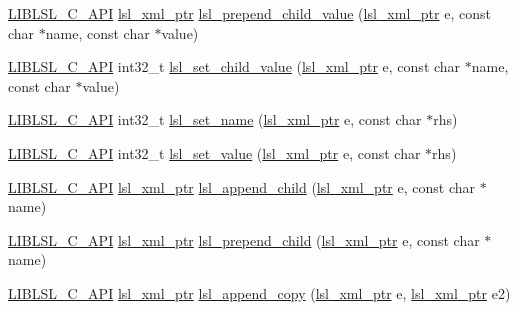 \begin{DoxyCompactItemize}
\item 
\hyperlink{lsl__cpp_8h_aafd0ef1813e8be84a1420c4f1df64615}{L\+I\+B\+L\+S\+L\+\_\+\+C\+\_\+\+A\+PI} \hyperlink{namespacelsl_a5edc7a49a1a1be1634fe6dce3d59c59b}{lsl\+\_\+xml\+\_\+ptr} \hyperlink{namespacelsl_a40369db591e0a19927d76b6d5c811a94}{lsl\+\_\+prepend\+\_\+child\+\_\+value} (\hyperlink{namespacelsl_a5edc7a49a1a1be1634fe6dce3d59c59b}{lsl\+\_\+xml\+\_\+ptr} e, const char $\ast$name, const char $\ast$value)
\item 
\hyperlink{lsl__cpp_8h_aafd0ef1813e8be84a1420c4f1df64615}{L\+I\+B\+L\+S\+L\+\_\+\+C\+\_\+\+A\+PI} int32\+\_\+t \hyperlink{namespacelsl_a637223b4077e6cfa0392d02f9f274ba7}{lsl\+\_\+set\+\_\+child\+\_\+value} (\hyperlink{namespacelsl_a5edc7a49a1a1be1634fe6dce3d59c59b}{lsl\+\_\+xml\+\_\+ptr} e, const char $\ast$name, const char $\ast$value)
\item 
\hyperlink{lsl__cpp_8h_aafd0ef1813e8be84a1420c4f1df64615}{L\+I\+B\+L\+S\+L\+\_\+\+C\+\_\+\+A\+PI} int32\+\_\+t \hyperlink{namespacelsl_af13c49d3abab79ae9dd6d94ca7cdc877}{lsl\+\_\+set\+\_\+name} (\hyperlink{namespacelsl_a5edc7a49a1a1be1634fe6dce3d59c59b}{lsl\+\_\+xml\+\_\+ptr} e, const char $\ast$rhs)
\item 
\hyperlink{lsl__cpp_8h_aafd0ef1813e8be84a1420c4f1df64615}{L\+I\+B\+L\+S\+L\+\_\+\+C\+\_\+\+A\+PI} int32\+\_\+t \hyperlink{namespacelsl_ab072800f46e425c22568529419a3301b}{lsl\+\_\+set\+\_\+value} (\hyperlink{namespacelsl_a5edc7a49a1a1be1634fe6dce3d59c59b}{lsl\+\_\+xml\+\_\+ptr} e, const char $\ast$rhs)
\item 
\hyperlink{lsl__cpp_8h_aafd0ef1813e8be84a1420c4f1df64615}{L\+I\+B\+L\+S\+L\+\_\+\+C\+\_\+\+A\+PI} \hyperlink{namespacelsl_a5edc7a49a1a1be1634fe6dce3d59c59b}{lsl\+\_\+xml\+\_\+ptr} \hyperlink{namespacelsl_a4e7b789b1a631d207683ba6fd821571f}{lsl\+\_\+append\+\_\+child} (\hyperlink{namespacelsl_a5edc7a49a1a1be1634fe6dce3d59c59b}{lsl\+\_\+xml\+\_\+ptr} e, const char $\ast$name)
\item 
\hyperlink{lsl__cpp_8h_aafd0ef1813e8be84a1420c4f1df64615}{L\+I\+B\+L\+S\+L\+\_\+\+C\+\_\+\+A\+PI} \hyperlink{namespacelsl_a5edc7a49a1a1be1634fe6dce3d59c59b}{lsl\+\_\+xml\+\_\+ptr} \hyperlink{namespacelsl_ad5354d401fb5eb531d7b96ee9747f76a}{lsl\+\_\+prepend\+\_\+child} (\hyperlink{namespacelsl_a5edc7a49a1a1be1634fe6dce3d59c59b}{lsl\+\_\+xml\+\_\+ptr} e, const char $\ast$name)
\item 
\hyperlink{lsl__cpp_8h_aafd0ef1813e8be84a1420c4f1df64615}{L\+I\+B\+L\+S\+L\+\_\+\+C\+\_\+\+A\+PI} \hyperlink{namespacelsl_a5edc7a49a1a1be1634fe6dce3d59c59b}{lsl\+\_\+xml\+\_\+ptr} \hyperlink{namespacelsl_a52061cbc108b95b34aa7d806d6115f91}{lsl\+\_\+append\+\_\+copy} (\hyperlink{namespacelsl_a5edc7a49a1a1be1634fe6dce3d59c59b}{lsl\+\_\+xml\+\_\+ptr} e, \hyperlink{namespacelsl_a5edc7a49a1a1be1634fe6dce3d59c59b}{lsl\+\_\+xml\+\_\+ptr} e2)

\end{DoxyCompactItemize}
